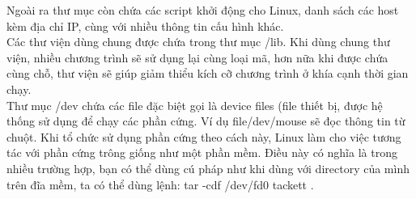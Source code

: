 \documentclass[twoside]{article}
\begin{document}
Ngoài ra thư mục còn chứa các script khởi động cho Linux, danh sách các host kèm địa chỉ IP, cùng với nhiều thông tin cấu hình khác.\\

Các thư viện dùng chung được chứa trong thư mục /lib. Khi dùng chung thư viện, nhiều chương trình sẽ sử dụng lại cùng loại mã, hơn nữa khi được chứa cùng chỗ, thư viện sẽ giúp giảm thiểu kích cỡ chương trình ở khía cạnh thời gian chạy. \\

Thư mục /dev chứa các file đặc biệt gọi là device files (file thiết bị, được hệ thống sử dụng để chạy các phần cứng. Ví dụ file/dev/mouse sẽ đọc thông tin từ chuột. Khi tổ chức sử dụng phần cứng theo cách này, Linux làm cho việc tương tác với phần cứng trông giống như một phần mềm. Điều này có nghĩa là trong nhiều trường hợp, bạn có thể dùng cú pháp như khi dùng với directory của mình trên đĩa mềm, ta có thể dùng lệnh: tar -cdf /dev/fd0 tackett . \\
\end{document}
